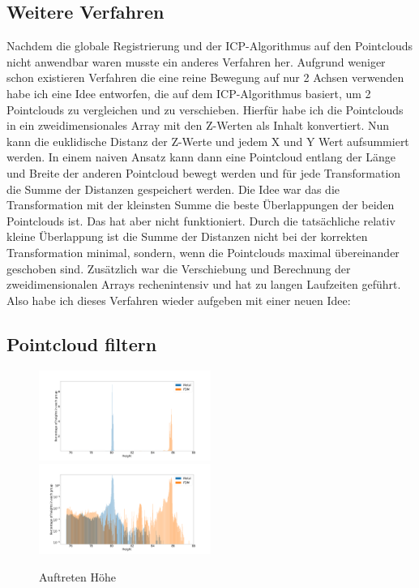 \documentclass[../main.tex]{subfiles}
\begin{document}
\subsection*{Weitere Verfahren}

Nachdem die globale Registrierung und der ICP-Algorithmus auf den Pointclouds nicht
anwendbar waren musste ein anderes Verfahren her. Aufgrund weniger schon existieren 
Verfahren die eine reine Bewegung auf nur 2 Achsen verwenden habe ich eine Idee 
entworfen, die auf dem ICP-Algorithmus basiert, um 2 Pointclouds zu vergleichen 
und zu verschieben. Hierfür habe ich die Pointclouds in ein zweidimensionales Array
mit den Z-Werten als Inhalt konvertiert. Nun kann die euklidische Distanz der Z-Werte
und jedem X und Y Wert aufsummiert werden. In einem naiven Ansatz kann dann eine 
Pointcloud entlang der Länge und Breite der anderen Pointcloud bewegt werden und für 
jede Transformation die Summe der Distanzen gespeichert werden. Die Idee war das die 
Transformation mit der kleinsten Summe die beste Überlappungen der beiden Pointclouds 
ist. Das hat aber nicht funktioniert. Durch die tatsächliche relativ kleine Überlappung 
ist die Summe der Distanzen nicht bei der korrekten Transformation minimal, 
sondern, wenn die Pointclouds maximal übereinander geschoben sind. Zusätzlich war die 
Verschiebung und Berechnung der zweidimensionalen Arrays rechenintensiv und hat zu 
langen Laufzeiten geführt. Also habe ich dieses Verfahren wieder aufgeben mit einer neuen
Idee:

\subsection{Pointcloud filtern}

\begin{figure}
    \centering
    \includegraphics[width=0.5\textwidth]{images/height_occurange.png}
    \includegraphics[width=0.5\textwidth]{images/height_occurange_log.png}
    \caption{Auftreten Höhe}
    \label{fig:brightness}
\end{figure}
\end{document}
